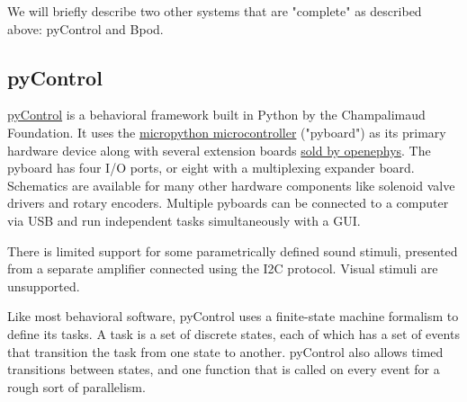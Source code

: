 We will briefly describe two other systems that are "complete" as described above: pyControl and Bpod.

\subsection{pyControl}

\href{https://pycontrol.readthedocs.io/en/latest/}{pyControl} is a behavioral framework built in Python by the Champalimaud Foundation. It uses the \href{https://micropython.org/}{micropython microcontroller} ("pyboard") as its primary hardware device along with several extension boards \href{http://www.open-ephys.org/store/pycontrol}{sold by openephys}. The pyboard has four I/O ports, or eight with a multiplexing expander board. Schematics are available for many other hardware components like solenoid valve drivers and rotary encoders. Multiple pyboards can be connected to a computer via USB and run independent tasks simultaneously with a GUI.

There is limited support for some parametrically defined sound stimuli, presented from a separate amplifier connected using the I2C protocol. Visual stimuli are unsupported.

Like most behavioral software, pyControl uses a finite-state machine formalism to define its tasks. A task is a set of discrete states, each of which has a set of events that transition the task from one state to another. pyControl also allows timed transitions between states, and one function that is called on every event for a rough sort of parallelism.


